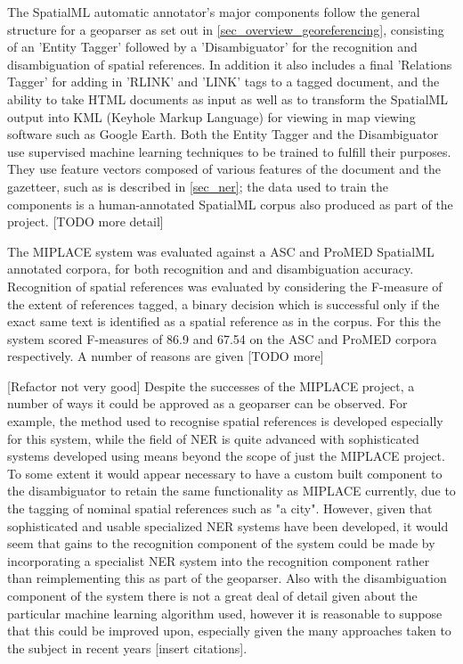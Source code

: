 \documentclass[12pt, a4paper]{report}
\begin{document}
The SpatialML automatic annotator's major components follow the general structure for a geoparser as set out in \ref{sec_overview_georeferencing}, consisting of an 'Entity Tagger' followed by a 'Disambiguator' for the recognition and disambiguation of spatial references. In addition it also includes a final 'Relations Tagger' for adding in 'RLINK' and 'LINK' tags to a tagged document, and the ability to take HTML documents as input as well as to transform the SpatialML output into KML (Keyhole Markup Language) for viewing in map viewing software such as Google Earth. Both the Entity Tagger and the Disambiguator use supervised machine learning techniques to be trained to fulfill their purposes. They use feature vectors composed of various features of the document and the gazetteer, such as is described in \ref{sec_ner}; the data used to train the components is a human-annotated SpatialML corpus also produced as part of the project. [TODO more detail]

The MIPLACE system was evaluated against a ASC and ProMED SpatialML annotated corpora, for both recognition and and disambiguation accuracy. Recognition of spatial references was evaluated by considering the F-measure of the extent of references tagged, a binary decision which is successful only if the exact same text is identified as a spatial reference as in the corpus. For this the system scored F-measures of 86.9 and 67.54 on the ASC and ProMED corpora respectively. A number of reasons are given [TODO more]

[Refactor not very good] Despite the successes of the MIPLACE project, a number of ways it could be approved as a geoparser can be observed. For example, the method used to recognise spatial references is developed especially for this system, while the field of NER is quite advanced with sophisticated systems developed using means beyond the scope of just the MIPLACE project. To some extent it would appear necessary to have a custom built component to the disambiguator to retain the same functionality as MIPLACE currently, due to the tagging of nominal spatial references such as "a city". However, given that sophisticated and usable specialized NER systems have been developed, it would seem that gains to the recognition component of the system could be made by incorporating a specialist NER system into the recognition component rather than reimplementing this as part of the geoparser. Also with the disambiguation component of the system there is not a great deal of detail given about the particular machine learning algorithm used, however it is reasonable to suppose that this could be improved upon, especially given the many approaches taken to the subject in recent years [insert citations].
\end{document}
